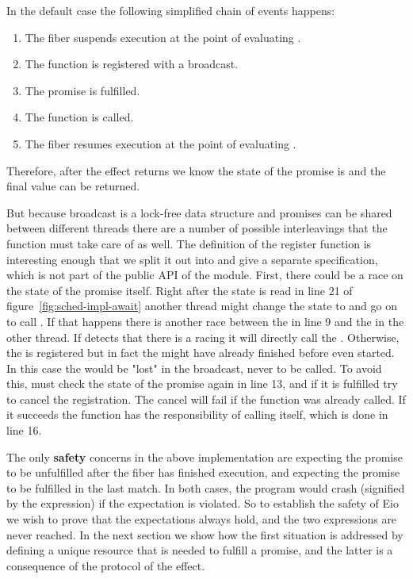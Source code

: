 In the default case the following simplified chain of events happens:
\begin{enumerate}
  \item The fiber suspends execution at the point of evaluating .
  \item The  function is registered with a broadcast.
  \item The promise is fulfilled.
  \item The  function is called.
  \item The fiber resumes execution at the point of evaluating .
\end{enumerate}
Therefore, after the \esuspend{} effect returns we know the state of the promise is  and the final value can be returned.

But because broadcast is a lock-free data structure and promises can be shared between different threads there are a number of possible interleavings that the  function must take care of as well.
The definition of the register function is interesting enough that we split it out into  and give a separate specification, which is not part of the public API of the module.
First, there could be a race on the state of the promise itself.
Right after the state is read in line 21 of figure~\ref{fig:sched-impl-await} another thread might change the state to  and go on to call .
If that happens there is another race between the  in line 9 and the  in the other thread.
If  detects that there is a racing  it will directly call the .
Otherwise, the  is registered but in fact the  might have already finished before  even started.
In this case the  would be "lost" in the broadcast, never to be called.
To avoid this,  must check the state of the promise again in line 13, and if it is fulfilled try to cancel the  registration.
The cancel will fail if the  function was already called.
If it succeeds the  function has the responsibility of calling  itself, which is done in line 16.

The only \textbf{safety} concerns in the above implementation are  expecting the promise to be unfulfilled after the fiber has finished execution, and  expecting the promise to be fulfilled in the last match.
In both cases, the program would crash (signified by the  expression) if the expectation is violated.
So to establish the safety of Eio we wish to prove that the expectations always hold, and the two  expressions are never reached.
In the next section we show how the first situation is addressed by defining a unique resource that is needed to fulfill a promise, and the latter is a consequence of the protocol of the \esuspend{} effect.

